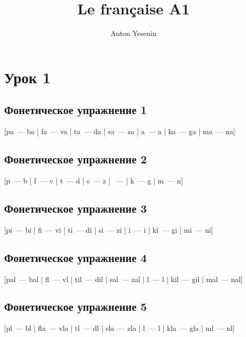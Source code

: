 \documentclass[10pt, oneside]{article}   	%
\title{Le française A1}
\author{Anton Yesenin}
\date{}							%
\begin{document}
\maketitle
\pagebreak

\section{Урок 1}


\subsection{Фонетическое упражнение 1}
[pa~--- ba | fa~--- va | ta~--- da | sa~--- za | {\textesh}a~--- {\textyogh}a | ka~--- ga | ma~--- na]
\subsection{Фонетическое упражнение 2}
[p{\textepsilon}~--- b{\textepsilon} | f{\textepsilon}~--- v{\textepsilon} | t{\textepsilon}~--- d{\textepsilon} | s{\textepsilon}~--- z{\textepsilon} | {\textesh}{\textepsilon}~--- {\textyogh}{\textepsilon} | k{\textepsilon}~--- g{\textepsilon} | m{\textepsilon}~--- n{\textepsilon}]
\subsection{Фонетическое упражнение 3}
[pi~--- bi | fi~--- vi | ti~--- di | si~--- zi | {\textesh}i~--- {\textyogh}i | ki~--- gi | mi~--- ni]
\subsection{Фонетическое упражнение 4}
[pal~--- bal | f{\textepsilon}l~--- v{\textepsilon}l | til~--- dil | sal~--- zal | {\textesh}{\textepsilon}l~--- {\textyogh}{\textepsilon}l | kil~--- gil | mal~--- nal]
\subsection{Фонетическое упражнение 5}
[pl{\textepsilon}~--- bl{\textepsilon} | fla~--- vla | tl{\textepsilon}~--- dl{\textepsilon} | sla~--- zla | {\textesh}l{\textepsilon}~--- {\textyogh}l{\textepsilon} | kla~--- gla | ml{\textepsilon}~--- nl{\textepsilon}]
\end{document}
